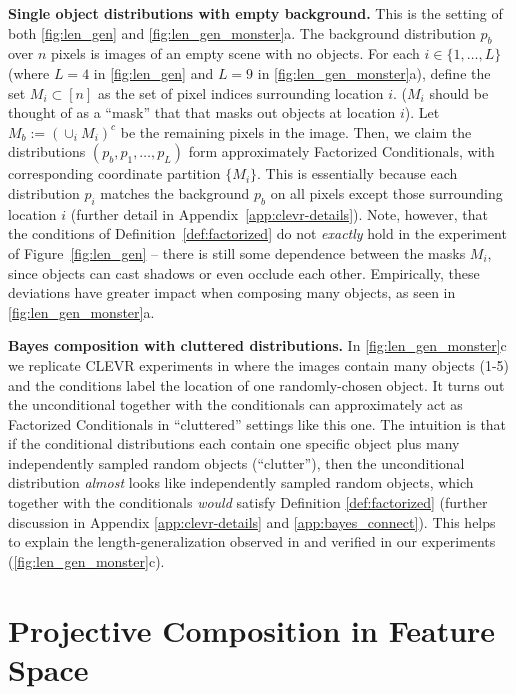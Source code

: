 \textbf{Single object distributions with empty background.}
This is the setting of both \cref{fig:len_gen} and \cref{fig:len_gen_monster}a.
The background distribution $p_b$ 
over $n$ pixels is images of an empty scene with no objects.
For each $i \in \{1,\ldots,L\}$ (where $L=4$ in \cref{fig:len_gen} and $L=9$ in \cref{fig:len_gen_monster}a), define the set $M_i \subset [n]$ 
as the set of pixel indices surrounding location $i$.
($M_i$ should be thought of as a ``mask'' that
that masks out objects at location $i$).
Let $M_b := (\cup_i M_i)^c$ be the remaining
pixels in the image.
Then, we claim the distributions $(p_b, p_1, \ldots, p_L)$
form approximately
Factorized Conditionals, with corresponding
coordinate partition $\{M_i\}$.
This is essentially because each distribution $p_i$
matches the background $p_b$ on all pixels except those surrounding
location $i$ (further detail in Appendix~\ref{app:clevr-details}).
Note, however, that the conditions of Definition~\ref{def:factorized}
do not \emph{exactly} hold in the experiment of Figure~\ref{fig:len_gen} -- there is still some dependence between
the masks $M_i$, since objects can cast shadows or even occlude each other.
Empirically, these deviations 
have greater impact
when composing many objects, as seen in \cref{fig:len_gen_monster}a.


\textbf{Bayes composition with cluttered distributions.}
In \cref{fig:len_gen_monster}c we replicate CLEVR experiments in  \citet{du2023reduce, liu2022compositional} where the images contain many objects (1-5) and the conditions label the location of one randomly-chosen object. It turns out the unconditional together with the conditionals can approximately act as Factorized Conditionals in ``cluttered'' settings like this one. The intuition is that if the conditional distributions each contain one specific object plus many independently sampled random objects (``clutter''), then the unconditional distribution \emph{almost} looks like independently sampled random objects, which together with the conditionals \emph{would} satisfy Definition \ref{def:factorized} (further discussion in Appendix \ref{app:clevr-details} and \ref{app:bayes_connect}). This helps to explain the length-generalization observed in \citet{liu2022compositional} and verified in our experiments (\cref{fig:len_gen_monster}c).







\section{Projective Composition in Feature Space}
\label{sec:comp_feature}

